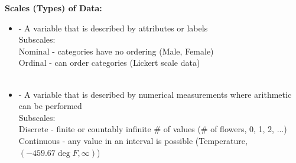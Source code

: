 \newpage

\Large \noindent \textbf{Scales (Types) of Data:}\large\\

\begin{itemize}
\item 
\underbar{~~~~~~~~~~~~~~~~~~~~~~~~~~~~~~~~~~~~~~}
- A variable that is described by attributes or labels\\
\indent Subscales: \\
Nominal - categories have no ordering (Male, Female)\\
Ordinal - can order categories (Lickert scale data)\\~\\
\item 
\underbar{~~~~~~~~~~~~~~~~~~~~~~~~~~~~~~~~~~~~~~}
- A variable that is described by numerical measurements where arithmetic can be performed\\
\indent Subscales: \\
Discrete - finite or countably infinite \# of values (\# of flowers, 0, 1, 2, ...)\\
Continuous - any value in an interval is possible (Temperature, $(-459.67\deg F, \infty)$)
\end{itemize}

